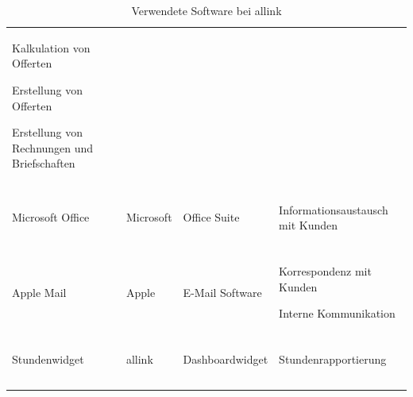 \begin{center}
\begin{longtable}{lllp{6cm}}
\begin{minipage}[t]{6cm}
                \begin{compactitem}
                    \item Kalkulation von Offerten
                    \item Erstellung von Offerten
                    \item Erstellung von Rechnungen und Briefschaften
                \end{compactitem}
            \end{minipage}
            \\\\
        \midrule Microsoft Office & Microsoft & Office Suite &
            \begin{minipage}[t]{6cm}
                \begin{compactitem}
                    \item Informationsaustausch mit Kunden
                \end{compactitem}
            \end{minipage}
            \\\\
        \midrule Apple Mail & Apple & E-Mail Software &
            \begin{minipage}[t]{6cm}
                \begin{compactitem}
                    \item Korrespondenz mit Kunden
                    \item Interne Kommunikation
                \end{compactitem}
            \end{minipage}
            \\\\
        \midrule Stundenwidget & allink & Dashboardwidget &
            \begin{minipage}[t]{6cm}
                \begin{compactitem}
                    \item Stundenrapportierung
                \end{compactitem}
            \end{minipage}
            \\\\
        \bottomrule
        \caption{Verwendete Software bei allink}
        \label{tab:verwendete_software}
    \end{longtable}
\end{center}

